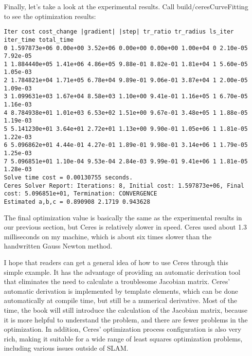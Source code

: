 Finally, let's take a look at the experimental results. Call build/ceresCurveFitting to see the optimization results:
\begin{lstlisting}
Iter cost cost_change |gradient| |step| tr_ratio tr_radius ls_iter iter_time total_time
0 1.597873e+06 0.00e+00 3.52e+06 0.00e+00 0.00e+00 1.00e+04 0 2.10e-05 7.92e-05
1 1.884440e+05 1.41e+06 4.86e+05 9.88e-01 8.82e-01 1.81e+04 1 5.60e-05 1.05e-03
2 1.784821e+04 1.71e+05 6.78e+04 9.89e-01 9.06e-01 3.87e+04 1 2.00e-05 1.09e-03
3 1.099631e+03 1.67e+04 8.58e+03 1.10e+00 9.41e-01 1.16e+05 1 6.70e-05 1.16e-03
4 8.784938e+01 1.01e+03 6.53e+02 1.51e+00 9.67e-01 3.48e+05 1 1.88e-05 1.19e-03
5 5.141230e+01 3.64e+01 2.72e+01 1.13e+00 9.90e-01 1.05e+06 1 1.81e-05 1.22e-03
6 5.096862e+01 4.44e-01 4.27e-01 1.89e-01 9.98e-01 3.14e+06 1 1.79e-05 1.25e-03
7 5.096851e+01 1.10e-04 9.53e-04 2.84e-03 9.99e-01 9.41e+06 1 1.81e-05 1.28e-03
Solve time cost = 0.00130755 seconds. 
Ceres Solver Report: Iterations: 8, Initial cost: 1.597873e+06, Final cost: 5.096851e+01, Termination: CONVERGENCE
Estimated a,b,c = 0.890908 2.1719 0.943628 
\end{lstlisting}

The final optimization value is basically the same as the experimental results in our previous section, but Ceres is relatively slower in speed. Ceres used about 1.3 milliseconds on my machine, which is about six times slower than the handwritten Gauss Newton method.

I hope that readers can get a general idea of how to use Ceres through this simple example. It has the advantage of providing an automatic derivation tool that eliminates the need to calculate a troublesome Jacobian matrix. Ceres' automatic derivation is implemented by template elements, which can be done automatically at compile time, but still be a numerical derivative. Most of the time, the book will still introduce the calculation of the Jacobian matrix, because it is more helpful to understand the problem, and there are fewer problems in the optimization. In addition, Ceres' optimization process configuration is also very rich, making it suitable for a wide range of least squares optimization problems, including various issues outside of SLAM.
